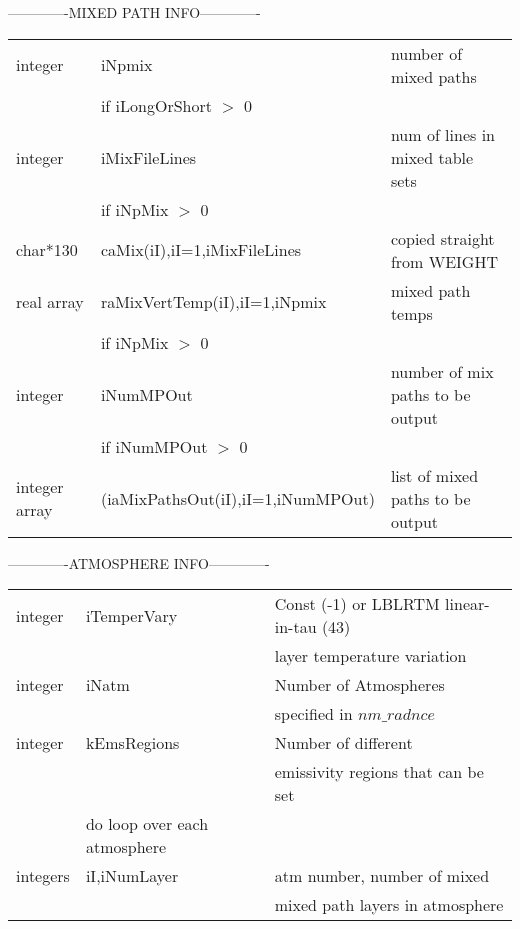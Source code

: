 \documentclass[12pt]{article}
\newlength{\colwidth}
\begin{document}
{{{{-------------MIXED PATH INFO-------------\\
\begin{small}
\begin{longtable}{llp{\colwidth}}
{\sf integer}  & iNpmix                  & number of mixed paths\\
               & if iLongOrShort $>$ 0   & \\
{\sf integer}  &\indent iMixFileLines    & num of lines in mixed table sets \\
               &\indent if iNpMix $>$ 0   & \\
{\sf char*130} &\indent \indent caMix(iI),iI=1,iMixFileLines & copied 
                                       straight from WEIGHT\\
{\sf real array}&\indent \indent raMixVertTemp(iI),iI=1,iNpmix 
                                         & mixed path temps\\
               & if iNpMix $>$ 0   & \\
{\sf integer}  &\indent iNumMPOut        & number of mix paths to be output\\
               & \indent if iNumMPOut $>$ 0 & \\
{\sf integer array} &\indent \indent (iaMixPathsOut(iI),iI=1,iNumMPOut) & 
list of mixed paths to be output\\
\end{longtable}
\end{small}
-------------ATMOSPHERE INFO-------------\\
\begin{small}
\begin{longtable}{llp{\colwidth}}
{\sf integer} &iTemperVary & Const (-1) or LBLRTM linear-in-tau (43) \\
              &      & layer temperature variation \\
{\sf integer} &iNatm & Number of Atmospheres \\
              &      & specified in $nm\_radnce$\\
{\sf integer} &kEmsRegions & Number of different \\
              &            & emissivity regions that can be set\\
              &do loop over each atmosphere & \\
{\sf integers}&\indent iI,iNumLayer         & atm number, number of mixed\\
              &                             & mixed path layers in atmosphere\\

\end{longtable}
\end{small}}}}}
\end{document}
